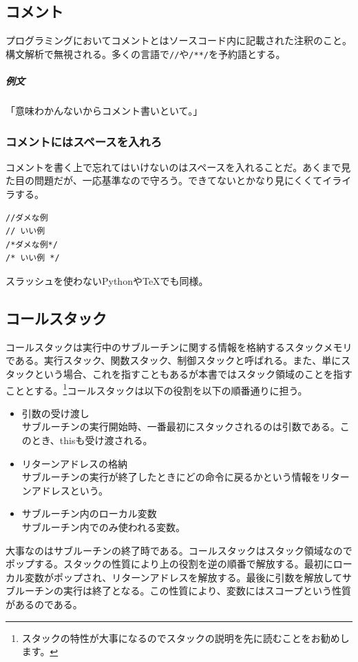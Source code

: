 \documentclass[dvipdfmx,jb5]{jreport}
\newcommand{\terlogy}[2][|]{\colorbox{terlogy}{\texttt{\lstinline#1#2#1}}}
\begin{document}
\subsection{コメント}
プログラミングにおいてコメントとはソースコード内に記載された注釈のこと。構文解析で無視される。多くの言語で\terlogy{//}や\terlogy{/**/}を予約語とする。

\subparagraph{例文} 「意味わかんないからコメント書いといて。」

\subsubsection{コメントにはスペースを入れろ}
コメントを書く上で忘れてはいけないのはスペースを入れることだ。あくまで見た目の問題だが、一応基準なので守ろう。できてないとかなり見にくくてイライラする。

\lstset{language=Java}
\begin{lstlisting}
//ダメな例
// いい例
/*ダメな例*/
/* いい例 */
\end{lstlisting}
スラッシュを使わないPythonや\TeX でも同様。

\subsection{コールスタック}
コールスタックは実行中のサブルーチンに関する情報を格納するスタックメモリである。実行スタック、関数スタック、制御スタックと呼ばれる。また、単にスタックという場合、これを指すこともあるが本書ではスタック領域のことを指すこととする。\footnote{スタックの特性が大事になるのでスタックの説明を先に読むことをお勧めします。}コールスタックは以下の役割を以下の順番通りに担う。
\begin{itemize}
      \item 引数の受け渡し\\
            サブルーチンの実行開始時、一番最初にスタックされるのは引数である。このとき、thisも受け渡される。
      \item リターンアドレスの格納\\
            サブルーチンの実行が終了したときにどの命令に戻るかという情報をリターンアドレスという。
      \item サブルーチン内のローカル変数\\
            サブルーチン内でのみ使われる変数。
\end{itemize}

大事なのはサブルーチンの終了時である。コールスタックはスタック領域なのでポップする。スタックの性質により上の役割を逆の順番で解放する。最初にローカル変数がポップされ、リターンアドレスを解放する。最後に引数を解放してサブルーチンの実行は終了となる。この性質により、変数にはスコープという性質があるのである。
\end{document}
